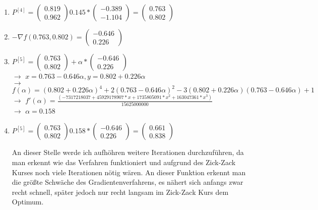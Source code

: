 \documentclass[a4paper, 11pt]{article}
\begin{document}
\begin{enumerate}
	\item
	$P^{[4]}=\left( \begin{array}{c} 0.819 \\ 0.962 \end{array} \right) 0.145 * \left( \begin{array}{c} -0.389 \\ -1.104 \end{array} \right) = \left( \begin{array}{c} 0.763 \\ 0.802 \end{array} \right)$
	
	\item
	$-{\nabla}f(0.763,0.802) = \left( \begin{array}{c} -0.646 \\ 0.226 \end{array} \right)$
	
	\item
	$P^{[5]}=\left( \begin{array}{c} 0.763 \\ 0.802 \end{array} \right) + \alpha * \left( \begin{array}{c} -0.646 \\ 0.226 \end{array} \right)$\\ $\rightarrow$ $x=0.763-0.646{\alpha}, y=0.802+0.226{\alpha}$\\ $\rightarrow$ $f(\alpha)=(0.802+0.226{\alpha})^4+2(0.763-0.646{\alpha})^2-3(0.802+0.226{\alpha})(0.763-0.646{\alpha})+1$\\ $\rightarrow$ $f'(\alpha)=\frac{(-7317218037+45929178907*x+1735805091*x^2+163047361*x^3)}{15625000000}$\\ $\rightarrow$ $\alpha=0.158$
	
	\item
	$P^{[5]}=\left( \begin{array}{c} 0.763 \\ 0.802 \end{array} \right) 0.158 * \left( \begin{array}{c} -0.646 \\ 0.226 \end{array} \right) = \left( \begin{array}{c} 0.661 \\0.838 \end{array} \right)$
	
	
	
		
An dieser Stelle werde ich aufhöhren weitere Iterationen durchzuführen, da man erkennt wie das Verfahren funktioniert und aufgrund des Zick-Zack Kurses noch viele Iterationen nötig wären. An dieser Funktion erkennt man die größte Schwäche des Gradientenverfahrens, es nähert sich anfangs zwar recht schnell, später jedoch nur recht langsam im Zick-Zack Kurs dem Optimum.\\
      
\end{enumerate}
\end{document}
